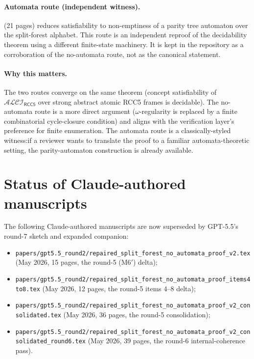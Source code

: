 \documentclass[11pt]{article}
\theoremstyle{definition}
\theoremstyle{remark}
\newcommand{\ALCIRCC}[1]{\mathcal{ALCI}_{\mathsf{RCC#1}}}
\begin{document}
\paragraph{Automata route (independent witness).}
\cite{GPT55AutomataRoute} (21 pages) reduces satisfiability to
non-emptiness of a parity tree automaton over the split-forest
alphabet.  This route is an independent reproof of the decidability
theorem using a different finite-state machinery.  It is kept in the
repository as a corroboration of the no-automata route, not as the
canonical statement.

\paragraph{Why this matters.}
The two routes converge on the same theorem (concept satisfiability
of $\ALCIRCC{5}$ over strong abstract atomic RCC5 frames is
decidable).  The no-automata route is a more direct argument
($\omega$-regularity is replaced by a finite combinatorial
cycle-closure condition) and aligns with the verification layer's
preference for finite enumeration.  The automata route is a
classically-styled witness:\@ if a reviewer wants to translate the
proof to a familiar automata-theoretic setting, the parity-automaton
construction is already available.

\section{Status of Claude-authored manuscripts}
\label{sec:status}

The following Claude-authored manuscripts are now superseded by
GPT-5.5's round-7 sketch and expanded companion:

\begin{itemize}
\item \texttt{papers/gpt5.5\_round2/repaired\_split\_forest\_no\_automata\_proof\_v2.tex}
(May 2026, 15 pages, the round-5 (M6$'$) delta);
\item \texttt{papers/gpt5.5\_round2/repaired\_split\_forest\_no\_automata\_proof\_items4to8.tex}
(May 2026, 12 pages, the round-5 items 4--8 delta);
\item \texttt{papers/gpt5.5\_round2/repaired\_split\_forest\_no\_automata\_proof\_v2\_consolidated.tex}
(May 2026, 36 pages, the round-5 consolidation);
\item \texttt{papers/gpt5.5\_round2/repaired\_split\_forest\_no\_automata\_proof\_v2\_consolidated\_round6.tex}
(May 2026, 39 pages, the round-6 internal-coherence pass).
\end{itemize}
\end{document}
